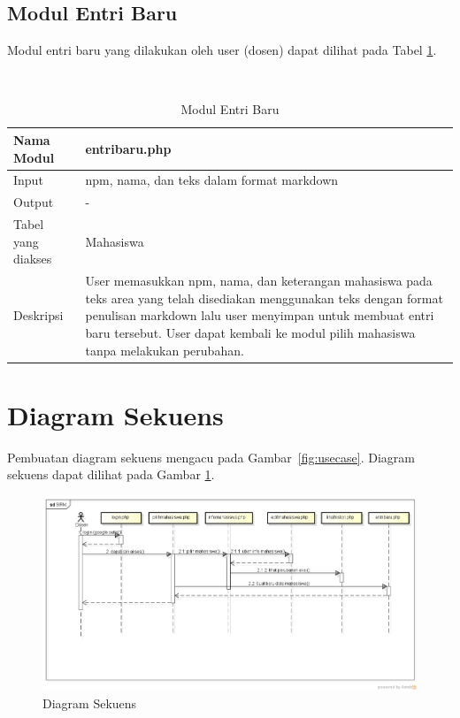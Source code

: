 \subsection{Modul Entri Baru}
Modul entri baru yang dilakukan oleh user (dosen) dapat dilihat pada Tabel \ref{tab:modulentribaru}.

\begin{center}
\begin{table}
\caption[Tabel 4-6 Modul Entri Baru]{Modul Entri Baru}\\
\label{tab:modulentribaru}
\begin{center}
\begin{tabular}{ l p{10cm} }
\hline
Nama Modul & entribaru.php\\
\hline
Input & npm, nama, dan teks dalam format markdown\\
\hline
Output & -\\
\hline
Tabel yang diakses & Mahasiswa\\
\hline
Deskripsi & User memasukkan npm, nama, dan keterangan mahasiswa pada teks area yang telah disediakan menggunakan teks dengan format penulisan markdown lalu user menyimpan untuk membuat entri baru tersebut. User dapat kembali ke modul pilih mahasiswa tanpa melakukan perubahan.\\
\hline
\end{tabular}
\end{center}
\end{table}
\end{center}

\section{Diagram Sekuens}
\label{sec:diagramsekuens}

Pembuatan diagram sekuens mengacu pada Gambar~\ref{fig:usecase}. Diagram sekuens dapat dilihat pada Gambar \ref{fig:ds}.

\begin{figure}[H]
\centering
\includegraphics[angle=90,origin=c,scale=0.5]{Gambar/sekuens.png}
\caption[Diagram Sekuens]{Diagram Sekuens} 
\label{fig:ds}
\end{figure}